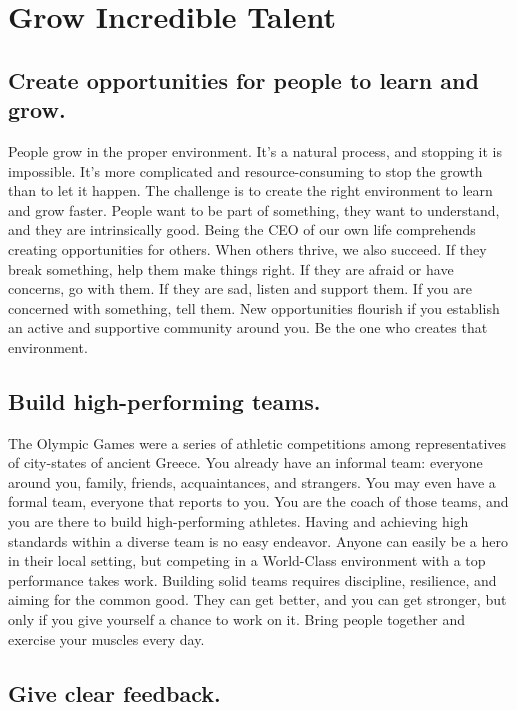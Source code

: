 \documentclass[10pt,a4paper]{book}
\begin{document}
\chapter{Grow Incredible Talent}

\section{Create opportunities for people to learn and grow.}

People grow in the proper environment. It's a natural process, and stopping it is impossible. It's more complicated and resource-consuming to stop the growth than to let it happen. The challenge is to create the right environment to learn and grow faster. People want to be part of something, they want to understand, and they are intrinsically good. Being the CEO of our own life comprehends creating opportunities for others. When others thrive, we also succeed. If they break something, help them make things right. If they are afraid or have concerns, go with them. If they are sad, listen and support them. If you are concerned with something, tell them. New opportunities flourish if you establish an active and supportive community around you. Be the one who creates that environment.

\section{Build high-performing teams.}

The Olympic Games were a series of athletic competitions among representatives of city-states of ancient Greece. You already have an informal team: everyone around you, family, friends, acquaintances, and strangers. You may even have a formal team, everyone that reports to you. You are the coach of those teams, and you are there to build high-performing athletes. Having and achieving high standards within a diverse team is no easy endeavor. Anyone can easily be a hero in their local setting, but competing in a World-Class environment with a top performance takes work. Building solid teams requires discipline, resilience, and aiming for the common good. They can get better, and you can get stronger, but only if you give yourself a chance to work on it. Bring people together and exercise your muscles every day.

\section{Give clear feedback.}
\end{document}
